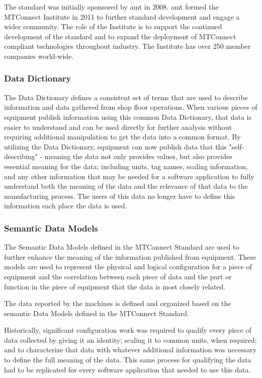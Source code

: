 The standard was initially sponsored by \gls{amt} in 2008. \gls{amt} formed the MTConnect Institute in 2011 to further standard development and engage a wider community. The role of the Institute is to support the continued development of the standard and to expand the deployment of MTConnect compliant technologies throughout industry. The Institute has over 250 member companies world-wide.  


\subsubsection{Data Dictionary}

The Data Dictionary defines a consistent set of terms that are used to describe information and data gathered from shop floor operations.   When various pieces of equipment publish information using this common Data Dictionary, that data is easier to understand and can be used directly for further analysis without requiring additional manipulation to get the data into a common format.  By utilizing the Data Dictionary, equipment can now publish data that this "self-describing" - meaning the data not only provides values, but also provides essential meaning for the data; including units, tag names, scaling information, and any other information that may be needed for a software application to fully understand both the meaning of the data and the relevance of that data to the manufacturing process.    The users of this data no longer have to define this information each place the data is used. 

\subsubsection{Semantic Data Models}
The Semantic Data Models defined in the MTConnect Standard are used to further enhance the meaning of the information published from equipment.  These models are used to represent the physical and logical configuration for a piece of equipment and the correlation between each piece of data and the part or function in the piece of equipment that the data is most closely related.   

The data reported by the machines is defined and organized based on the semantic Data Models defined in the MTConnect Standard.   

Historically, significant configuration work was required to qualify every piece of data collected by giving it an identity; scaling it to common units, when required; and to characterize that data with whatever additional information was necessary to define the full meaning of the data.   This same process for qualifying the data had to be replicated for every software application that needed to use this data.    

